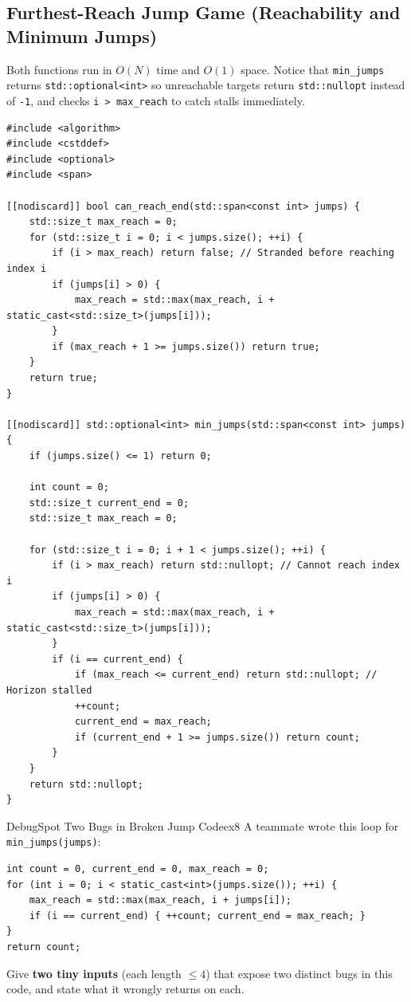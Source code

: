 \documentclass[11pt,a4paper]{article}
\theoremstyle{definition}
\begin{document}
\subsection{Furthest-Reach Jump Game (Reachability and Minimum Jumps)}

Both functions run in $O(N)$ time and $O(1)$ space. Notice that \texttt{min\_jumps} returns \texttt{std::optional<int>} so unreachable targets return \texttt{std::nullopt} instead of \texttt{-1}, and checks \texttt{i > max\_reach} to catch stalls immediately.

\begin{lstlisting}[caption={Jump Game reachability and minimum jumps in $O(N)$ time and $O(1)$ space}]
#include <algorithm>
#include <cstddef>
#include <optional>
#include <span>

[[nodiscard]] bool can_reach_end(std::span<const int> jumps) {
    std::size_t max_reach = 0;
    for (std::size_t i = 0; i < jumps.size(); ++i) {
        if (i > max_reach) return false; // Stranded before reaching index i
        if (jumps[i] > 0) {
            max_reach = std::max(max_reach, i + static_cast<std::size_t>(jumps[i]));
        }
        if (max_reach + 1 >= jumps.size()) return true;
    }
    return true;
}

[[nodiscard]] std::optional<int> min_jumps(std::span<const int> jumps) {
    if (jumps.size() <= 1) return 0;

    int count = 0;
    std::size_t current_end = 0;
    std::size_t max_reach = 0;

    for (std::size_t i = 0; i + 1 < jumps.size(); ++i) {
        if (i > max_reach) return std::nullopt; // Cannot reach index i
        if (jumps[i] > 0) {
            max_reach = std::max(max_reach, i + static_cast<std::size_t>(jumps[i]));
        }
        if (i == current_end) {
            if (max_reach <= current_end) return std::nullopt; // Horizon stalled
            ++count;
            current_end = max_reach;
            if (current_end + 1 >= jumps.size()) return count;
        }
    }
    return std::nullopt;
}
\end{lstlisting}

\begin{tryitbox}{Debug}{Spot Two Bugs in Broken Jump Code}{ex8}
A teammate wrote this loop for \texttt{min\_jumps(jumps)}:
\begin{verbatim}
int count = 0, current_end = 0, max_reach = 0;
for (int i = 0; i < static_cast<int>(jumps.size()); ++i) {
    max_reach = std::max(max_reach, i + jumps[i]);
    if (i == current_end) { ++count; current_end = max_reach; }
}
return count;
\end{verbatim}
Give \textbf{two tiny inputs} (each length $\le 4$) that expose two distinct bugs in this code, and state what it wrongly returns on each.
\end{tryitbox}
\end{document}
